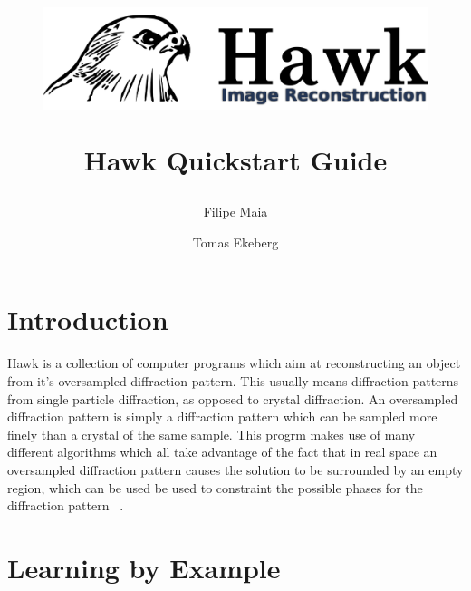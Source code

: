 \documentclass{report}
\begin{document}
\title{
\begin{figure}[!h]
\centering
\includegraphics[width=15cm]{Hawk2.png}
\label{hawk-cover}
\end{figure}
\vspace {1.0in}
{\Huge Hawk Quickstart Guide} }
\author {Filipe Maia \and Tomas Ekeberg}

\maketitle

\parindent=0pt 
\baselineskip=18pt 
\lineskip=0pt

\tableofcontents

\pagestyle{headings}

\def\delfo{$\delta_{fo}$~}
\def\delfc{$\delta_{fc}$~}
\def\qq{\qquad\qquad}
\def\hbar{\overline{h}}



\chapter{Introduction} 
\label{intro}

\vspace {0.1in}

Hawk is a collection of computer programs which aim at reconstructing an object from 
it's oversampled  diffraction pattern. This usually means diffraction patterns from 
single particle diffraction, as opposed to crystal diffraction. An oversampled diffraction
 pattern is simply a diffraction pattern which can be sampled more finely than a crystal
 of the same sample. This progrm makes use of many different algorithms which all take
 advantage of the fact that in real space an oversampled diffraction pattern causes 
the solution to be surrounded by an empty region, which can be used be used to 
constraint the possible phases for the diffraction pattern ~\cite{Miao2000}.

\chapter{Learning by Example}
\label{tutorial}
\end{document}
